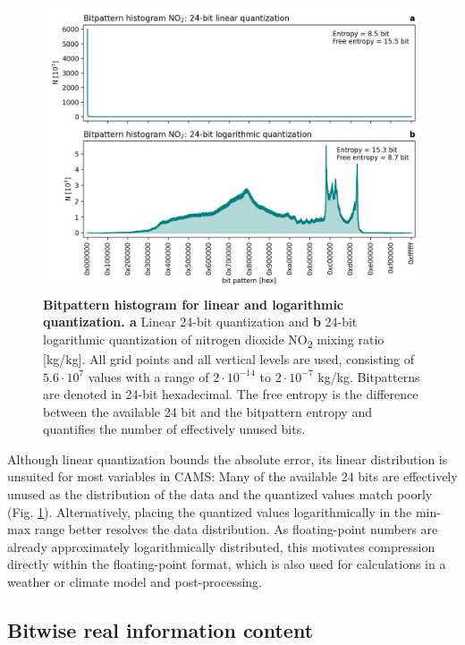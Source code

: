 \begin{figure}[tbhp]
	\includegraphics[width=1\textwidth]{Figures/compression/bitpattern_hist.png}
	\caption{\textbf{Bitpattern histogram for linear and logarithmic quantization. a}
	Linear 24-bit quantization and \textbf{b} 24-bit logarithmic quantization of nitrogen dioxide NO\textsubscript{2} mixing ratio [kg/kg].
	All grid points and all vertical levels are used, consisting of $5.6 \cdot 10^7$ values with a range of $2 \cdot 10^{-14}$ to
	$2 \cdot 10^{-7}$ kg/kg. Bitpatterns are denoted in 24-bit hexadecimal. The free entropy is the difference between the
	available 24 bit and the bitpattern entropy and quantifies the number of effectively unused bits.}
	\label{fig:compression_bitpattern_hist}
\end{figure}

Although linear quantization bounds the absolute error, its linear distribution is unsuited for most variables in CAMS:
Many of the available 24 bits are effectively unused as the distribution of the data and the quantized values match
poorly (Fig. \ref{fig:compression_bitpattern_hist}). Alternatively, placing the quantized values logarithmically in the
min-max range better resolves the data distribution. As floating-point numbers are already approximately logarithmically
distributed, this motivates compression directly within the floating-point format, which is also used for calculations in a
weather or climate model and post-processing.

\subsection{Bitwise real information content}


